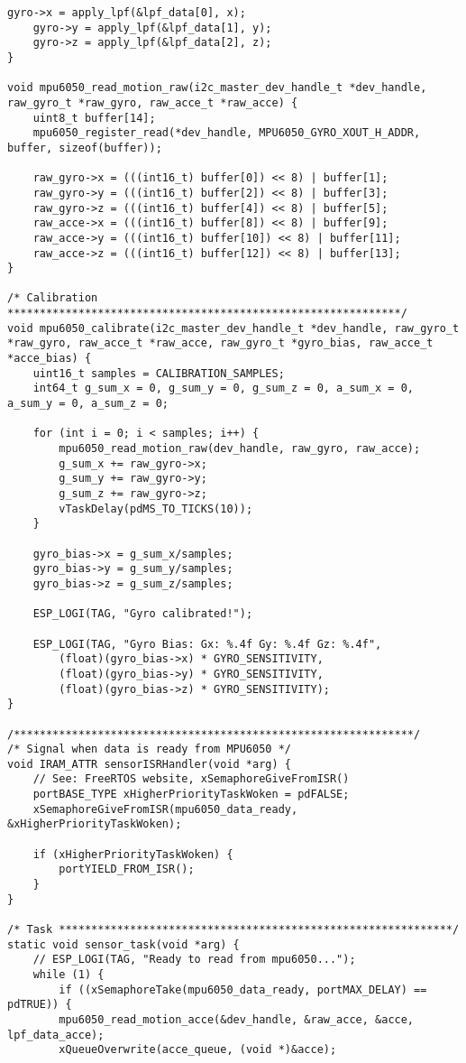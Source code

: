 \begin{lstlisting}[caption={Register Read}]
    gyro->x = apply_lpf(&lpf_data[0], x);
    gyro->y = apply_lpf(&lpf_data[1], y);
    gyro->z = apply_lpf(&lpf_data[2], z);
}

void mpu6050_read_motion_raw(i2c_master_dev_handle_t *dev_handle, raw_gyro_t *raw_gyro, raw_acce_t *raw_acce) {
    uint8_t buffer[14];
    mpu6050_register_read(*dev_handle, MPU6050_GYRO_XOUT_H_ADDR, buffer, sizeof(buffer));

    raw_gyro->x = (((int16_t) buffer[0]) << 8) | buffer[1];
    raw_gyro->y = (((int16_t) buffer[2]) << 8) | buffer[3];
    raw_gyro->z = (((int16_t) buffer[4]) << 8) | buffer[5];
    raw_acce->x = (((int16_t) buffer[8]) << 8) | buffer[9];
    raw_acce->y = (((int16_t) buffer[10]) << 8) | buffer[11];
    raw_acce->z = (((int16_t) buffer[12]) << 8) | buffer[13];
}

/* Calibration *************************************************************/
void mpu6050_calibrate(i2c_master_dev_handle_t *dev_handle, raw_gyro_t *raw_gyro, raw_acce_t *raw_acce, raw_gyro_t *gyro_bias, raw_acce_t *acce_bias) {
    uint16_t samples = CALIBRATION_SAMPLES;
    int64_t g_sum_x = 0, g_sum_y = 0, g_sum_z = 0, a_sum_x = 0, a_sum_y = 0, a_sum_z = 0;

    for (int i = 0; i < samples; i++) {
        mpu6050_read_motion_raw(dev_handle, raw_gyro, raw_acce);
        g_sum_x += raw_gyro->x;
        g_sum_y += raw_gyro->y;
        g_sum_z += raw_gyro->z;
        vTaskDelay(pdMS_TO_TICKS(10)); 
    }

    gyro_bias->x = g_sum_x/samples;
    gyro_bias->y = g_sum_y/samples;
    gyro_bias->z = g_sum_z/samples;

    ESP_LOGI(TAG, "Gyro calibrated!");

    ESP_LOGI(TAG, "Gyro Bias: Gx: %.4f Gy: %.4f Gz: %.4f",
        (float)(gyro_bias->x) * GYRO_SENSITIVITY,
        (float)(gyro_bias->y) * GYRO_SENSITIVITY,
        (float)(gyro_bias->z) * GYRO_SENSITIVITY);
}

/**************************************************************/
/* Signal when data is ready from MPU6050 */
void IRAM_ATTR sensorISRHandler(void *arg) {
    // See: FreeRTOS website, xSemaphoreGiveFromISR()
    portBASE_TYPE xHigherPriorityTaskWoken = pdFALSE;
    xSemaphoreGiveFromISR(mpu6050_data_ready, &xHigherPriorityTaskWoken);

    if (xHigherPriorityTaskWoken) {
        portYIELD_FROM_ISR();
    }
}

/* Task *************************************************************/
static void sensor_task(void *arg) {
    // ESP_LOGI(TAG, "Ready to read from mpu6050...");
    while (1) {
        if ((xSemaphoreTake(mpu6050_data_ready, portMAX_DELAY) == pdTRUE)) {
        mpu6050_read_motion_acce(&dev_handle, &raw_acce, &acce, lpf_data_acce);
        xQueueOverwrite(acce_queue, (void *)&acce);


\end{lstlisting}
